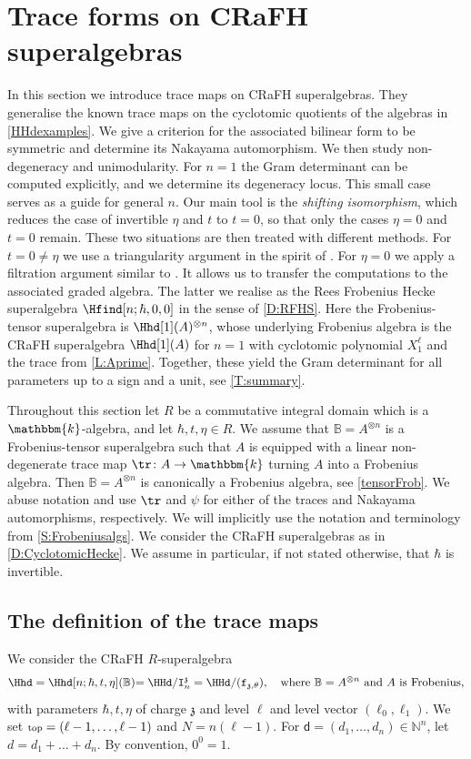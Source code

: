 \documentclass[a4paper,11pt]{amsart}
\numberwithin{equation}{subsection}
\theoremstyle{definition}
\theoremstyle{theorem}
\theoremstyle{remark}
\newcommand\charge{{\mathfrak{z}}}
\newcommand\Ic[1][n]{\mathtt{I}^\charge_{#1}}
\newcommand\fct{\mathtt{f}_{\charge,\theta}}
\newcommand\ELL{\text{\scriptsize top}}%
\newcommand\bd{\mathsf{d}}
\newcommand\N{\mathbb{N}}
\newcommand\kk{\mathbbm{k}}
\newcommand\RR{R}
\newcommand{\Bo}{\mathbb{B}}
\begin{document}
\section{Trace forms on CRaFH superalgebras}
In this section we introduce trace maps on CRaFH superalgebras. They generalise the known trace maps on the cyclotomic quotients of the algebras in \autoref{HHdexamples}. We give a criterion for the associated bilinear form to be symmetric and determine its Nakayama automorphism. We then study non-degeneracy and unimodularity. For $n=1$ the Gram determinant can be computed explicitly, and we determine its degeneracy locus. This small case serves as a guide for general $n$. Our main tool is the \emph{shifting isomorphism}, which reduces the case of invertible $\eta$ and $t$ to $t=0$, so that only the cases $\eta=0$ and $t=0$ remain. These two situations are then treated with different methods. For $t=0\neq\eta$ we use a triangularity argument in the spirit of \cite{MalleMathas}. For $\eta=0$ we apply a filtration argument similar to \cite{BK:HigherSchurWeyl}. It allows us to transfer the computations to the associated graded algebra. The latter  we realise as the Rees Frobenius Hecke superalgebra $\Hfind[n;\hbar,0,0]$ in the sense of  \autoref{D:RFHS}. Here the Frobenius-tensor superalgebra is $\Hhd[1](A)^{\otimes n}$, whose underlying Frobenius algebra is the CRaFH superalgebra $\Hhd[1](A)$ for $n=1$ with cyclotomic polynomial $X_1^\ell$ and the trace from \autoref{L:Aprime}. Together, these yield the Gram determinant for all parameters up to a sign and a unit, see \autoref{T:summary}.


    Throughout  this section let $\RR$ be a commutative integral domain which is a $\kk$-algebra, and let $\hbar,t,\eta\in \RR$.  We assume that $\Bo=A^{\otimes n}$ is a Frobenius-tensor superalgebra such that $A$ is equipped with a linear non-degenerate trace map $\tr\colon A\to\kk$ turning $A$ into a Frobenius algebra. Then ${\Bo}=A^{\otimes n}$ is canonically a Frobenius algebra, see
   \autoref{tensorFrob}.  We abuse notation and use $\tr$ and $\psi$ for
   either of the traces {and} Nakayama automorphisms, respectively. We will
   implicitly use the notation and terminology from \autoref{S:Frobeniusalgs}. We consider the CRaFH superalgebras  as in \autoref{D:CyclotomicHecke}. We assume in particular, if not stated otherwise, that $\hbar$ is invertible.
     \subsection{The definition of the trace maps}
  We consider the CRaFH $\RR$-superalgebra
\begin{equation}\label{ass}
\Hhd=\Hhd[n;\hbar, t, \eta](\Bo){=\HHd/\Ic=\HHd/(\fct)},\quad \text{where $\Bo=A^{\otimes n}$  and $A$ is Frobenius,}
\end{equation}
with parameters $\hbar,t,\eta$ of charge $\charge$ and level $\ell$ and level vector $(\ell_0,\ell_1)$. We set $\ELL=(\ell-1,\dots,\ell-1)$ and $N=n(\ell-1)$.
For $\bd=(d_1,\dots,d_n)\in\N^n$, let $d=d_1+\dots+d_n$. By  convention, $0^0=1$.
\end{document}
